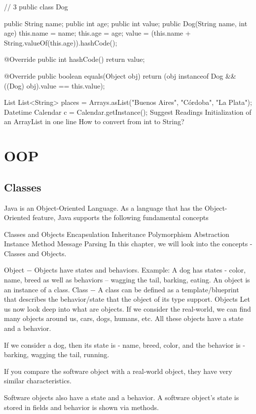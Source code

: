 // 3
public class Dog {
    public String name;
    public int age;
    public int value;
    public Dog(String name, int age){
        this.name = name;
        this.age = age;
        value = (this.name + String.valueOf(this.age)).hashCode();
    }

    @Override
    public int hashCode() {
        return value;
    }

    @Override
    public boolean equals(Object obj) {
        return (obj instanceof Dog && ((Dog) obj).value == this.value);
    }
}
List
List<String> places = Arrays.asList("Buenos Aires", "Córdoba", "La Plata");
Datetime
Calendar c = Calendar.getInstance();
Suggest Readings
Initialization of an ArrayList in one line
How to convert from int to String?

\section{OOP}

\subsection{Classes}

Java is an Object-Oriented Language. As a language that has the Object-Oriented feature, Java supports the following fundamental concepts

Classes and Objects
Encapsulation
Inheritance
Polymorphism
Abstraction
Instance
Method
Message Parsing
In this chapter, we will look into the concepts - Classes and Objects.

Object − Objects have states and behaviors. Example: A dog has states - color, name, breed as well as behaviors – wagging the tail, barking, eating. An object is an instance of a class.
Class − A class can be defined as a template/blueprint that describes the behavior/state that the object of its type support.
Objects
Let us now look deep into what are objects. If we consider the real-world, we can find many objects around us, cars, dogs, humans, etc. All these objects have a state and a behavior.

If we consider a dog, then its state is - name, breed, color, and the behavior is - barking, wagging the tail, running.

If you compare the software object with a real-world object, they have very similar characteristics.

Software objects also have a state and a behavior. A software object's state is stored in fields and behavior is shown via methods.

